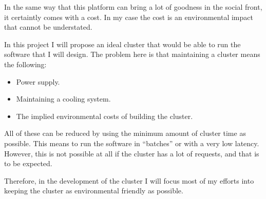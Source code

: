 \documentclass[a4paper,12pt]{article}
\newcommand{\mylist}{
\begin{itemize}
\setlength{\itemsep}{1pt}
\setlength{\parskip}{0pt}
\setlength{\parsep}{0pt}}
\newcommand{\mylistend}{\end{itemize}}
\begin{document}
In the same way that this platform can bring a lot of goodness in the social
front, it certaintly comes with a cost. In my case the cost is an environmental
impact that cannot be understated.

In this project I will propose an ideal cluster that would be able to run the
software that I will design. The problem here is that maintaining a cluster
means the following:

\mylist
  \item Power supply.
  \item Maintaining a cooling system.
  \item The implied environmental costs of building the cluster.
\mylistend

All of these can be reduced by using the minimum amount of cluster time as
possible. This means to run the software in ``batches'' or with a very low
latency. However, this is not possible at all if the cluster has a lot of
requests, and that is to be expected.

Therefore, in the development of the cluster I will focus most of my efforts
into keeping the cluster as environmental friendly as possible.
\end{document}
